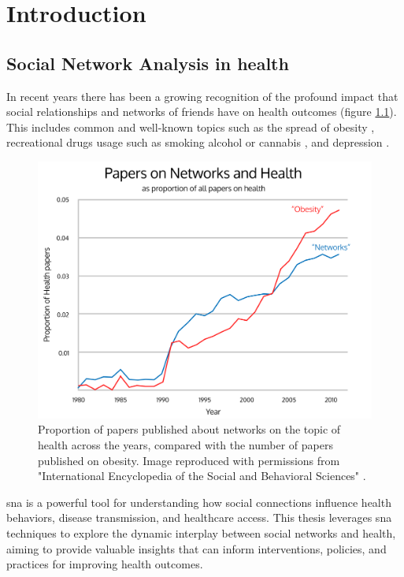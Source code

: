 \chapter{Introduction}
\label{chapter:chapter intro}

\section{ Social Network Analysis in health }

In recent years there has been a growing recognition of the profound impact that social relationships and networks of friends have on health outcomes (figure \ref{figure:networkNetworkRise}). This includes common and well-known topics such as the spread of obesity \cite{Christakis2007, Trogdon2008}, recreational drugs usage such as smoking \cite{Christakis2008, Aschbrenner2018} alcohol \cite{Rosenquist2010, Ali2014} or cannabis \cite{Mednick2010}, and  depression \cite{Rosenquist2010}.

    \begin{figure}[H]
        \centering
            \includegraphics[width=0.7\linewidth]{figures/Social/paperSocialRemastered.png} 
        \caption{Proportion of papers published about networks on the topic of health across the years, compared with the number of papers published on obesity. Image reproduced with permissions from "International Encyclopedia of the Social and Behavioral Sciences" \cite{ref:networkRises}.}
        \label{figure:networkNetworkRise}
    \end{figure}

\gls{sna} is a powerful tool for understanding how social connections influence health behaviors, disease transmission, and healthcare access. This thesis leverages \gls{sna} techniques to explore the dynamic interplay between social networks and health, aiming to provide valuable insights that can inform interventions, policies, and practices for improving health outcomes.

